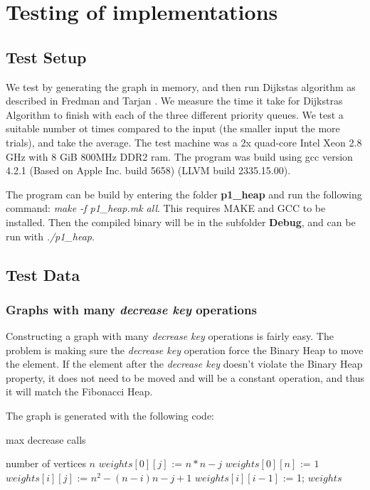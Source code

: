 \section*{Testing of implementations}
\subsection*{Test Setup}
  We test by generating the graph in memory, and then run Dijkstas algorithm as described in Fredman and Tarjan \cite{fibheap}. We measure the time it take for Dijkstras Algorithm to finish with each of the three different priority queues. We test a suitable number ot times compared to the input (the smaller input the more trials), and take the average. The test machine was a 2x quad-core Intel Xeon 2.8 GHz with 8 GiB 800MHz DDR2 ram. The program was build using gcc version 4.2.1 (Based on Apple Inc. build 5658) (LLVM build 2335.15.00).

  The program can be build by entering the folder \textbf{p1\_heap} and run the following command: \textit{make -f p1\_heap.mk all}. This requires MAKE and GCC to be installed. Then the compiled binary will be in the subfolder \textbf{Debug}, and can be run with \textit{./p1\_heap}.

\subsection*{Test Data}
  \subsubsection*{Graphs with many \textit{decrease key} operations} 
    Constructing a graph with many \textit{decrease key} operations is fairly easy. The problem is making sure the \textit{decrease key} operation force the Binary Heap to move the element. If the element after the \textit{decrease key} doesn't violate the Binary Heap property, it does not need to be moved and will be a constant operation, and thus it will match the Fibonacci Heap.

    The graph is generated with the following code:
    \begin{algorithm}
      \caption{ max decrease calls}
      \begin{algorithmic}[1]
	\REQUIRE number of vertices $n$
	    \STATE $weights[0][j]$ := $n*n -j$
	  \ENDFOR
	  \STATE $weights[0][n]$ := $1$
	      \STATE $weights[i][j]$ := $n^2 - (n - i)n - j + 1$
	    \ENDFOR
	    \STATE $weights[i][i-1]$ := 1;
	  \ENDFOR
	\RETURN $weights$
\end{algorithmic}
\end{algorithm}

